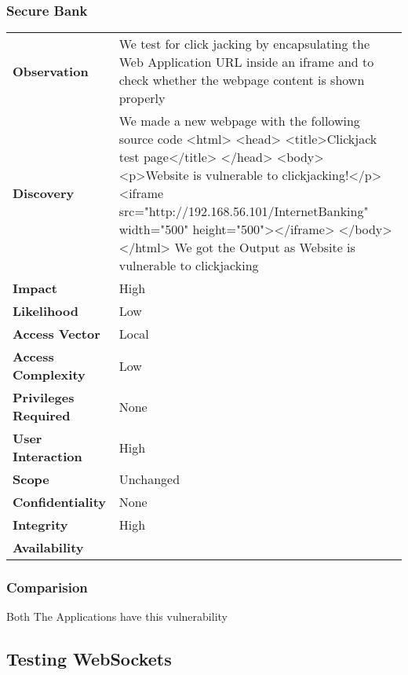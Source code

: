 \subsubsection{Secure Bank}
\begin{tabular}{l|p{10cm}}
\textbf{Observation} & We test for click jacking by encapsulating the Web Application URL inside an iframe and to check whether the webpage content is shown properly   \\
\textbf{Discovery} & We made a new webpage with the following source code
<html>
   <head>
     <title>Clickjack test page</title>
   </head>
   <body>
     <p>Website is vulnerable to clickjacking!</p>
     <iframe src="http://192.168.56.101/InternetBanking" width="500" height="500"></iframe>
   </body>
</html>
We got the Output as Website is vulnerable to clickjacking
 \\
\textbf{Impact} &  High\\
\textbf{Likelihood} & Low \\
\textbf{Access Vector} & Local \\
\textbf{Access Complexity} &  Low\\
\textbf{Privileges Required} & None \\
\textbf{User Interaction} & High \\
\textbf{Scope} & Unchanged \\
\textbf{Confidentiality} & None \\
\textbf{Integrity} & High \\
\textbf{Availability} &  \\
\end{tabular}

\subsubsection{Comparision}
Both The Applications have this vulnerability

\subsection{Testing WebSockets}
